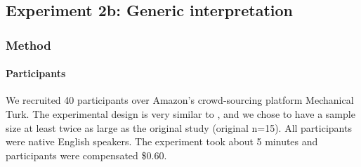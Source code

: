 \documentclass[floatsintext,doc]{apa6}
\let\oldparagraph\paragraph
\renewcommand{\paragraph}[1]{\oldparagraph{#1}\mbox{}}
\begin{document}
\subsection{Experiment 2b: Generic interpretation}

\subsubsection{Method}\label{method}

\paragraph{Participants}
We recruited 40 participants over Amazon's crowd-sourcing platform Mechanical Turk.
The experimental design is very similar to , and we chose to have a sample size at least twice as large as the original study (original n=15).
All participants were native English speakers.
The experiment took about 5 minutes and participants were compensated \$0.60.

\end{document}
